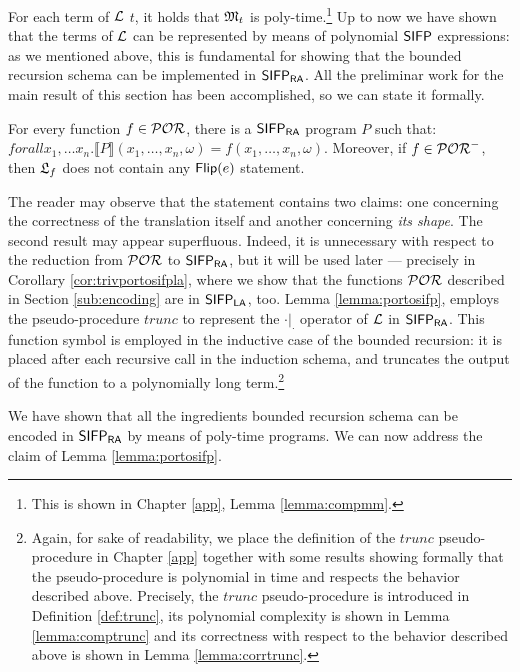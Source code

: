 For each term of $\mathcal{L}$ $t$, it holds that $\mathfrak M_t$ is
poly-time.\footnote{This is shown in Chapter \ref{app}, Lemma \ref{lemma:compmm}.}
%
%
Up to now we have shown that the terms of $\mathcal{L}$ can be represented
by means of polynomial $\mathsf{SIFP}$ expressions: as we mentioned above, this is
fundamental for showing that the bounded recursion schema can be implemented in
$\mathsf{SIFP_{{\mathsf{RA}}}}$. All the preliminar work for the main result of this section
has been accomplished, so we can state it formally.


\begin{lemma}
\label{lemma:portosifp}
For every function $f \in \mathcal{POR}$, there is a $\mathsf{SIFP_{{\mathsf{RA}}}}$ program $P$
such that:
$forall x_1, \ldots x_n.
\llbracket P\rrbracket(x_1, \ldots, x_n, \omega)=f(x_1, \ldots, x_n, \omega)$.
Moreover, if $f \in \mathcal{POR}^-$, then ${\mathfrak L_{f}}$ does not contain any $\mathsf{Flip(}e\mathsf{)}$ statement.
\end{lemma}

The reader may observe that the statement contains two claims: one concerning the
correctness of the translation itself and another concerning \emph{its shape}.
The second result may appear superfluous. Indeed,
it is unnecessary with respect to the reduction from $\mathcal{POR}$ to $\mathsf{SIFP_{{\mathsf{RA}}}}$, but
it will be used later --- precisely in Corollary \ref{cor:trivportosifpla},
where we show that the functions $\mathcal{POR}$ described in Section \ref{sub:encoding}
are in $\mathsf{SIFP_{{\mathsf{LA}}}}$, too.
%
Lemma \ref{lemma:portosifp}, employs the
pseudo-procedure $\mathit{trunc}$
to represent the $\cdot|_\cdot$ operator of $\mathcal{L}$ in $\mathsf{SIFP_{{\mathsf{RA}}}}$.
This function symbol is employed in the inductive case of the bounded
recursion: it is placed
after each recursive call in the induction schema, and truncates the
output of the function to a polynomially long term.\footnote{%
%
Again, for sake of readability, we place the definition of the  $\mathit{trunc}$
pseudo-procedure in Chapter \ref{app} together with
some results showing formally that the pseudo-procedure is polynomial in time
and respects the behavior described above.
%
Precisely, the $\mathit{trunc}$ pseudo-procedure is introduced in Definition
\ref{def:trunc},
its polynomial complexity is shown in Lemma \ref{lemma:comptrunc}
and its correctness with respect to the behavior described above is shown in Lemma \ref{lemma:corrtrunc}.
}



We have shown that all the ingredients bounded recursion schema
can be encoded in $\mathsf{SIFP_{{\mathsf{RA}}}}$ by means of poly-time programs.
We can now address the claim of Lemma \ref{lemma:portosifp}.

